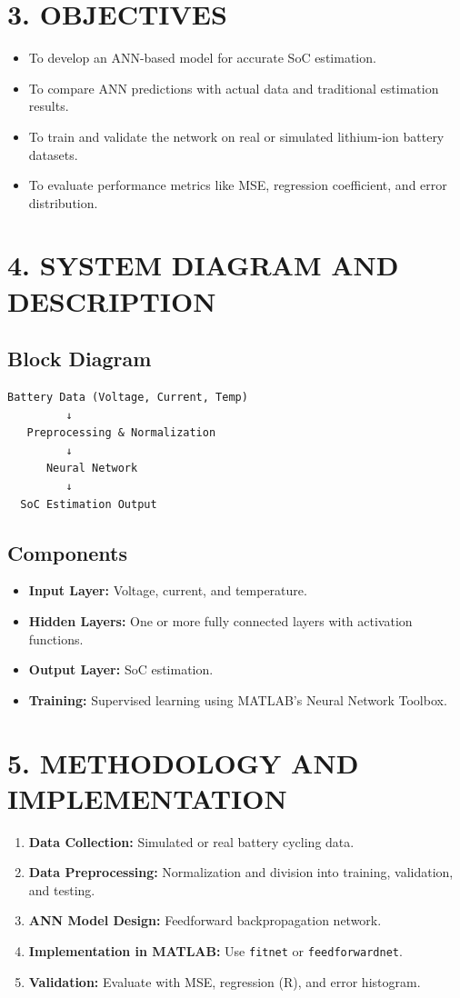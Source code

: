 \documentclass[12pt]{article}
\begin{document}
\section*{3. OBJECTIVES}
\begin{itemize}
    \item To develop an ANN-based model for accurate SoC estimation.
    \item To compare ANN predictions with actual data and traditional estimation results.
    \item To train and validate the network on real or simulated lithium-ion battery datasets.
    \item To evaluate performance metrics like MSE, regression coefficient, and error distribution.
\end{itemize}

\section*{4. SYSTEM DIAGRAM AND DESCRIPTION}
\subsection*{Block Diagram}
\begin{verbatim}
Battery Data (Voltage, Current, Temp)
         ↓
   Preprocessing & Normalization
         ↓
      Neural Network
         ↓
  SoC Estimation Output
\end{verbatim}

\subsection*{Components}
\begin{itemize}
    \item \textbf{Input Layer:} Voltage, current, and temperature.
    \item \textbf{Hidden Layers:} One or more fully connected layers with activation functions.
    \item \textbf{Output Layer:} SoC estimation.
    \item \textbf{Training:} Supervised learning using MATLAB’s Neural Network Toolbox.
\end{itemize}

\section*{5. METHODOLOGY AND IMPLEMENTATION}
\begin{enumerate}
    \item \textbf{Data Collection:} Simulated or real battery cycling data.
    \item \textbf{Data Preprocessing:} Normalization and division into training, validation, and testing.
    \item \textbf{ANN Model Design:} Feedforward backpropagation network.
    \item \textbf{Implementation in MATLAB:} Use \texttt{fitnet} or \texttt{feedforwardnet}.
    \item \textbf{Validation:} Evaluate with MSE, regression (R), and error histogram.
\end{enumerate}
\end{document}
